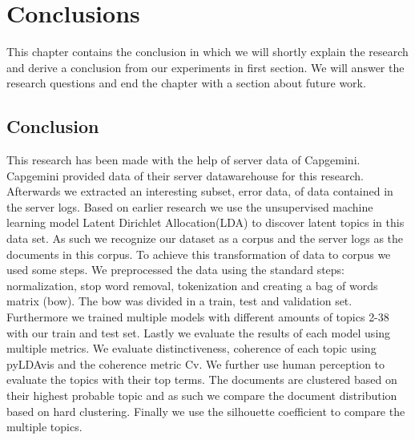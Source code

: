 \chapter{Conclusions} \label{ch:conclusions}
This chapter contains the conclusion in which we will shortly explain the research and derive a conclusion from our experiments in first section. We will answer the research questions and end the chapter with a section about future work. 

\section{Conclusion}
This research has been made with the help of server data of Capgemini. Capgemini provided data of their server datawarehouse for this research. Afterwards we extracted an interesting subset, error data, of data contained in the server logs. Based on earlier research we use the unsupervised machine learning model Latent Dirichlet Allocation(LDA) to discover latent topics in this data set. As such we recognize our dataset as a corpus and the server logs as the documents in this corpus. To achieve this transformation of data to corpus we used some steps.
We preprocessed the data using the standard steps: normalization, stop word removal, tokenization and creating a bag of words matrix (bow). The bow was divided in a train, test and validation set. Furthermore we trained multiple models with different amounts of topics {2-38} with our train and test set. Lastly we evaluate the results of each model using multiple metrics. We evaluate distinctiveness, coherence of each topic using pyLDAvis and the coherence metric Cv. We further use human perception to evaluate the topics with their top terms. The documents are clustered based on their highest probable topic and as such we compare the document distribution based on hard clustering. Finally we use the silhouette coefficient to compare the multiple topics. 


